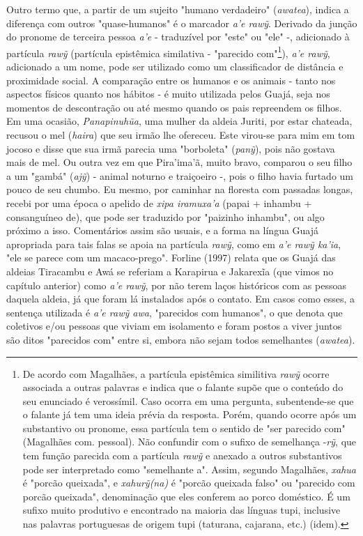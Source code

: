 Outro termo que, a partir de um sujeito "humano verdadeiro"
(\emph{awatea}), indica a diferença com outros "quase-humanos" é o
marcador \emph{a'e rawỹ}. Derivado da junção do pronome de terceira
pessoa \emph{a'e} - traduzível por "este" ou "ele" -, adicionado à
partícula \emph{rawỹ} (partícula epistêmica similativa - "parecido
com"\footnote{De acordo com Magalhães, a partícula epistêmica similitiva
  \emph{rawỹ} ocorre associada a outras palavras e indica que o falante
  supõe que o conteúdo do seu enunciado é verossímil. Caso ocorra em uma
  pergunta, subentende-se que o falante já tem uma ideia prévia da
  resposta. Porém, quando ocorre após um substantivo ou pronome, essa
  partícula tem o sentido de "ser parecido com" (Magalhães com.
  pessoal). Não confundir com o sufixo de semelhança -\emph{rỹ}, que tem
  função parecida com a partícula \emph{rawỹ} e anexado a outros
  substantivos pode ser interpretado como "semelhante a". Assim, segundo
  Magalhães, \emph{xahua} é "porcão queixada", e \emph{xahurỹ(na)} é
  "porcão queixada falso" ou "parecido com porcão queixada", denominação
  que eles conferem ao porco doméstico. É um sufixo muito produtivo e
  encontrado na maioria das línguas tupi, inclusive nas palavras
  portuguesas de origem tupi (taturana, cajarana, etc.) (idem).}),
\emph{a'e rawỹ}, adicionado a um nome, pode ser utilizado como um
classificador de distância e proximidade social. A comparação entre os
humanos e os animais - tanto nos aspectos físicos quanto nos hábitos - é
muito utilizada pelos Guajá, seja nos momentos de descontração ou até
mesmo quando os pais repreendem os filhos. Em uma ocasião,
\emph{Panapinuhũa}, uma mulher da aldeia Juriti, por estar chateada,
recusou o mel (\emph{haira}) que seu irmão lhe ofereceu. Este virou-se
para mim em tom jocoso e disse que sua irmã parecia uma "borboleta"
(\emph{panỹ}), pois não gostava mais de mel. Ou outra vez em que
Pira'ima'ã, muito bravo, comparou o seu filho a um "gambá" (\emph{ajỹ})
- animal noturno e traiçoeiro -, pois o filho havia furtado um pouco de
seu chumbo. Eu mesmo, por caminhar na floresta com passadas longas,
recebi por uma época o apelido de \emph{xipa iramuxa'a} (papai + inhambu
+ consanguíneo de), que pode ser traduzido por "paizinho inhambu", ou
algo próximo a isso. Comentários assim são usuais, e a forma na língua
Guajá apropriada para tais falas se apoia na partícula \emph{rawỹ}, como
em \emph{a'e rawỹ ka'ia}, "ele se parece com um macaco-prego". Forline
(1997) relata que os Guajá das aldeias Tiracambu e Awá se referiam a
Karapirua e Jakarexĩa (que vimos no capítulo anterior) como \emph{a'e
rawỹ}, por não terem laços históricos com as pessoas daquela aldeia, já
que foram lá instalados após o contato. Em casos como esses, a sentença
utilizada é \emph{a'e rawỹ awa}, "parecidos com humanos", o que denota
que coletivos e/ou pessoas que viviam em isolamento e foram postos a
viver juntos são ditos "parecidos com" entre si, embora não sejam todos
semelhantes (\emph{awatea}).

